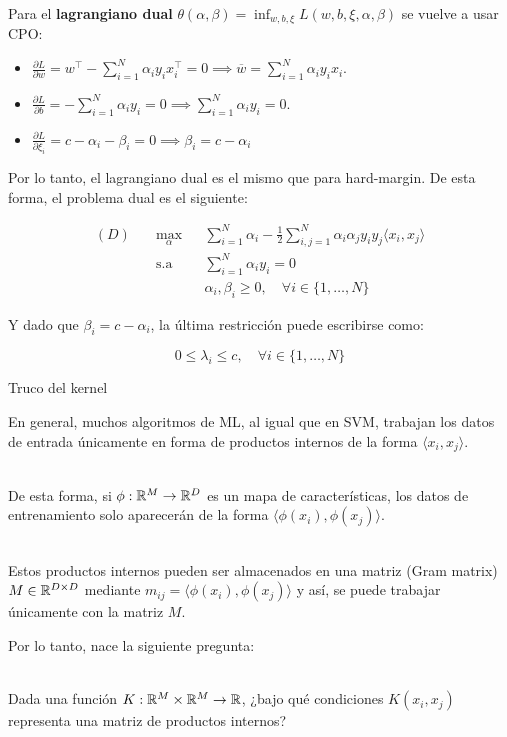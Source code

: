 \documentclass[handout, 9pt]{beamer}
\begin{document}
\begin{frame}
	Para el \textbf{lagrangiano dual} $\theta(\alpha,\beta)=\inf_{w,b,\xi} L(w,b,\xi,\alpha,\beta)$ se vuelve a usar CPO:
	
	\begin{itemize}
	\item $\frac{\partial L}{\partial w} = w^\top - \sum_{i=1}^N \alpha_i y_i x_i^\top = 0 \implies \overline{w} = \sum_{i=1}^N \alpha_i y_i x_i$.
	\item $\frac{\partial L}{\partial b} = -\sum_{i=1}^N \alpha_i y_i = 0 \implies \sum_{i=1}^N \alpha_i y_i = 0$.
	\item $\frac{\partial L}{\partial \xi_i} =c-\alpha_i-\beta_i=0\implies \beta_i=c-\alpha_i$
\end{itemize}

Por lo tanto, el lagrangiano dual es el mismo que para hard-margin. De esta forma, el problema dual es el siguiente:

\begin{equation*}
\begin{aligned}
(D)\quad & \underset{\alpha}{\text{max}}
& & \sum\limits_{i=1}^{N}\alpha_i - \frac{1}{2} \sum\limits_{i,j=1}^{N} \alpha_i \alpha_j y_i y_j \langle x_i, x_j\rangle\\
& \text{s.a}
& & \sum\limits_{i=1}^{N} \alpha_i y_i= 0 \\
& &  & \alpha_i, \beta_i\geq 0,\quad \forall i\in\{1,\ldots,N\}
\end{aligned}
\end{equation*}
	
Y dado que $\beta_i=c-\alpha_i$, la última restricción puede escribirse como:

\begin{equation*}
	0\leq \lambda_i\leq c,\quad \forall i\in\{1,\ldots,N\}
\end{equation*}

\end{frame}


\begin{frame}{Truco del kernel}

En general, muchos algoritmos de ML, al igual que en SVM, trabajan los datos de entrada únicamente en forma de productos internos de la forma $\langle x_i,x_j\rangle$.\\~\

De esta forma, si $\phi:\mathbb{R}^M\to\mathbb{R}^D$ es un mapa de características, los datos de entrenamiento solo aparecerán de la forma $\langle \phi(x_i),\phi(x_j)\rangle$.\\~\

Estos productos internos pueden ser almacenados en una matriz (Gram matrix) $M\in\mathbb{R}^{D\times D}$ mediante $m_{ij}=\langle \phi(x_i),\phi(x_j)\rangle$ y así, se puede trabajar únicamente con la matriz $M$.

Por lo tanto, nace la siguiente pregunta:\\~\

Dada una función $K:\mathbb{R}^M\times\mathbb{R}^M\to\mathbb{R}$, ¿bajo qué condiciones $K(x_i,x_j)$ representa una matriz de productos internos?
 	
\end{frame}
\end{document}
